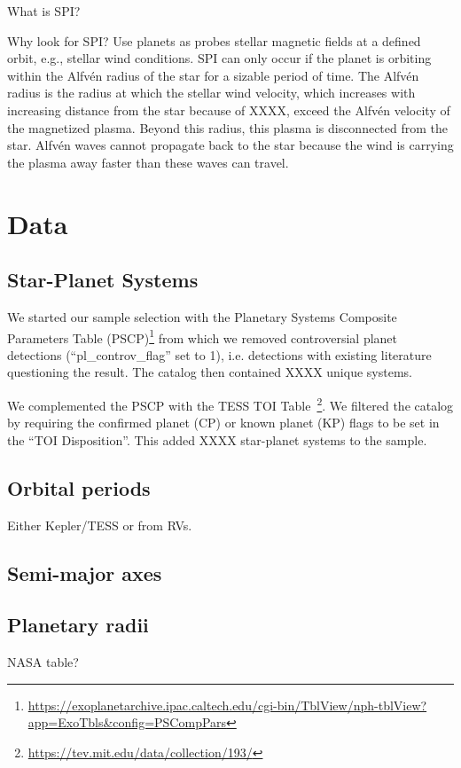 \documentclass[twocolumn]{aastex631}
\begin{document}
What is SPI?

Why look for SPI? Use planets as probes stellar magnetic fields at a defined orbit, e.g., stellar wind conditions. SPI can only occur if the planet is orbiting within the Alfv\'en radius of the star for a sizable period of time. The Alfv\'en radius is the radius at which the stellar wind velocity, which increases with increasing distance from the star because of XXXX, exceed the Alfv\'en velocity of the magnetized plasma. Beyond this radius, this plasma is disconnected from the star. Alfv\'en waves cannot propagate back to the star because the wind is carrying the plasma away faster than these waves can travel.





\section{Data}
\label{sec:methods}
\subsection{Star-Planet Systems}
We started our sample selection with the Planetary Systems Composite Parameters Table (PSCP)\footnote{ \url{https://exoplanetarchive.ipac.caltech.edu/cgi-bin/TblView/nph-tblView?app=ExoTbls&config=PSCompPars}} from which we removed controversial planet detections (``pl\_controv\_flag'' set to 1), i.e. detections with existing literature questioning the result. The catalog then contained XXXX unique systems.

We complemented the PSCP with the TESS TOI Table~\citep[TT][]{guerrero2021arxiv}\footnote{\url{https://tev.mit.edu/data/collection/193/}}. We filtered the catalog by requiring the confirmed planet (CP) or known planet (KP) flags to be set in the ``TOI Disposition''. This added XXXX star-planet systems to the sample.
\subsection{Orbital periods}
Either Kepler/TESS or from RVs.

\subsection{Semi-major axes}


\subsection{Planetary radii}
NASA table?
\end{document}
